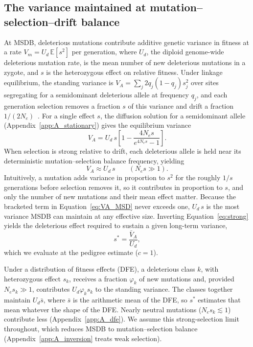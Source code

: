 \documentclass{article}
\begin{document}
\subsection{The variance maintained at mutation--selection--drift balance}\label{sec:msdb}
At MSDB, deleterious mutations contribute additive genetic variance in fitness at a rate $V_m = U_d\,\mathbb{E}[s^2]$ per generation, where $U_d$, the diploid genome-wide deleterious mutation rate, is the mean number of new deleterious mutations in a zygote, and $s$ is the heterozygous effect on relative fitness. Under linkage equilibrium, the standing variance is $V_A = \sum_j 2q_j(1-q_j)s_j^2$ over sites segregating for a semidominant deleterious allele at frequency $q_j$, and each generation selection removes a fraction $s$ of this variance and drift a fraction $1/(2N_e)$~\cite{burger1989,charlesworth2015}. For a single effect $s$, the diffusion solution for a semidominant allele~\cite{kimura1969} (Appendix~\ref{app:A_stationary}) gives the equilibrium variance
\begin{equation}
    V_A = U_d\,s\left[1 - \frac{4N_es}{e^{4N_es} - 1}\right]. \label{eq:VA_MSD}
\end{equation}
When selection is strong relative to drift, each deleterious allele is held near its deterministic mutation--selection balance frequency, yielding~\cite{mukai1972,charlesworth2012}
\begin{equation}
    V_A \approx U_d\,s \qquad (N_es \gg 1). \label{eq:strong}
\end{equation}
Intuitively, a mutation adds variance in proportion to $s^2$ for the roughly $1/s$ generations before selection removes it, so it contributes in proportion to $s$, and only the number of new mutations and their mean effect matter. Because the bracketed term in Equation~\eqref{eq:VA_MSD} never exceeds one, $U_d\,s$ is the most variance MSDB can maintain at any effective size. Inverting Equation~\eqref{eq:strong} yields the deleterious effect required to sustain a given long-term variance,
\begin{equation}
    s^* = \frac{\bar{V}_A}{U_d}, \label{eq:sstar}
\end{equation}
which we evaluate at the pedigree estimate ($c = 1$).

Under a distribution of fitness effects (DFE), a deleterious class $k$, with heterozygous effect $s_k$, receives a fraction $\varphi_k$ of new mutations and, provided $N_es_k \gg 1$, contributes $U_d\varphi_ks_k$ to the standing variance. The classes together maintain $U_d\bar{s}$, where $\bar{s}$ is the arithmetic mean of the DFE, so $s^*$ estimates that mean whatever the shape of the DFE. Nearly neutral mutations ($N_es_k \lesssim 1$) contribute less (Appendix~\ref{app:A_dfe}). We assume this strong-selection limit throughout, which reduces MSDB to mutation--selection balance (Appendix~\ref{app:A_inversion} treats weak selection).
\end{document}
